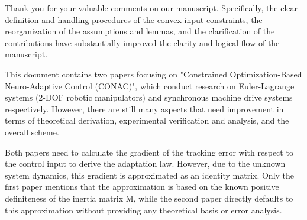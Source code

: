 \documentclass[12pt,english]{reviewresponse}
\begin{document}
\begin{concludingresponse}[]
	Thank you for your valuable comments on our manuscript. 
  Specifically, the clear definition and handling procedures of the convex input constraints, the reorganization of the assumptions and lemmas, and the clarification of the contributions have substantially improved the clarity and logical flow of the manuscript.
\end{concludingresponse}

\reviewer
\begin{generalcomment}
	This document contains two papers focusing on "Constrained Optimization-Based Neuro-Adaptive Control (CONAC)", which conduct research on Euler-Lagrange systems (2-DOF robotic manipulators) and synchronous machine drive systems respectively. However, there are still many aspects that need improvement in terms of theoretical derivation, experimental verification and analysis, and the overall scheme.
\end{generalcomment}

% 
\begin{revcomment}[3][1]{}
	Both papers need to calculate the gradient of the tracking error with respect to the control input to derive the adaptation law. 
  However, due to the unknown system dynamics, this gradient is approximated as an identity matrix. 
  Only the first paper mentions that the approximation is based on the known positive definiteness of the inertia matrix M, while the second paper directly defaults to this approximation without providing any theoretical basis or error analysis.
\end{revcomment}
\end{document}
